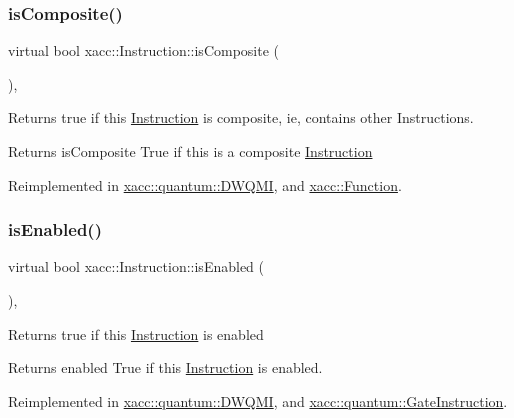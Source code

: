 \subsubsection{\texorpdfstring{is\+Composite()}{isComposite()}}
{\footnotesize\ttfamily virtual bool xacc\+::\+Instruction\+::is\+Composite (\begin{DoxyParamCaption}{ }\end{DoxyParamCaption})\hspace{0.3cm}{\ttfamily [inline]}, {\ttfamily [virtual]}}

Returns true if this \hyperlink{a01155}{Instruction} is composite, ie, contains other Instructions.

\begin{DoxyReturn}{Returns}
is\+Composite True if this is a composite \hyperlink{a01155}{Instruction} 
\end{DoxyReturn}


Reimplemented in \hyperlink{a00987_ad2b3b4ee72dee48150bf78d92c52e5e0}{xacc\+::quantum\+::\+D\+W\+Q\+MI}, and \hyperlink{a01151_aa75500c657b5c3e0e36213e1506aad97}{xacc\+::\+Function}.

\mbox{\label{a01155_ad02a1cf7220577124720b7a51424cea7}} 
\subsubsection{\texorpdfstring{is\+Enabled()}{isEnabled()}}
{\footnotesize\ttfamily virtual bool xacc\+::\+Instruction\+::is\+Enabled (\begin{DoxyParamCaption}{ }\end{DoxyParamCaption})\hspace{0.3cm}{\ttfamily [inline]}, {\ttfamily [virtual]}}

Returns true if this \hyperlink{a01155}{Instruction} is enabled

\begin{DoxyReturn}{Returns}
enabled True if this \hyperlink{a01155}{Instruction} is enabled. 
\end{DoxyReturn}


Reimplemented in \hyperlink{a00987_aea76901b30d85172ef26fc317b4c0ed7}{xacc\+::quantum\+::\+D\+W\+Q\+MI}, and \hyperlink{a01015_a0a821be322b0c848b01c55f91fc8f484}{xacc\+::quantum\+::\+Gate\+Instruction}.

\mbox{\label{a01155_a7b24d8ae485369fc2b2df7a3224a5e26}} 
